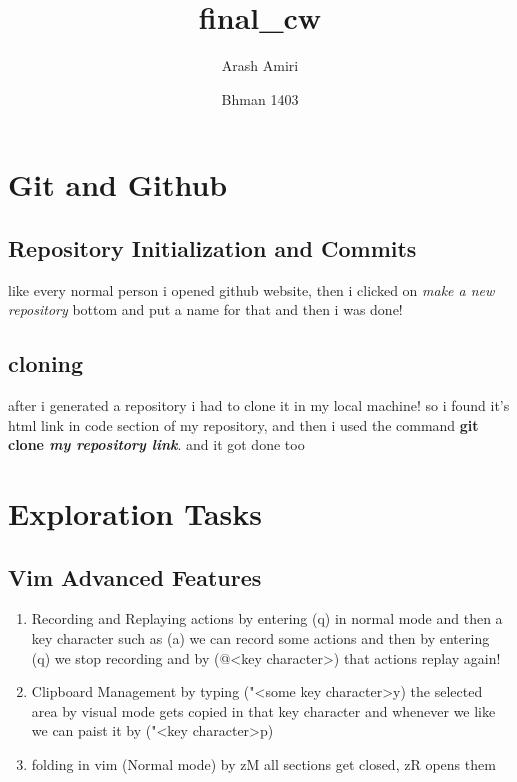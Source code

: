 \documentclass[titlepage]{article}
\title{final\_cw}
\author{Arash Amiri}
\date{Bhman 1403}
\begin{document}
\maketitle
\tableofcontents
\newpage
\section{Git and Github}
\subsection{Repository Initialization and Commits}
like every normal person i opened github website, then i clicked on \textit{make a new repository} bottom and put a name for that and then i was done!
\subsection{cloning}
after i generated a repository i had to clone it in my local machine! so i found it's html link in code section of my repository, and then i used the command \textbf{git clone \textit{my repository link}}. and it got done too
\section{Exploration Tasks}
\subsection{Vim Advanced Features}
\begin{enumerate}
    \item Recording and Replaying actions\newline
    by entering (q) in normal mode and then a key character such as (a) we can record some actions and then by entering (q) we stop recording and by (@<key character>) that actions replay again!
    \item Clipboard Management\newline
    by typing ("<some key character>y) the selected area by visual mode gets copied in that key character and whenever we like we can paist it by ("<key character>p)
    \item folding\newline
    in vim (Normal mode) by zM all sections get closed, zR opens them
\end{enumerate}
\end{document}
